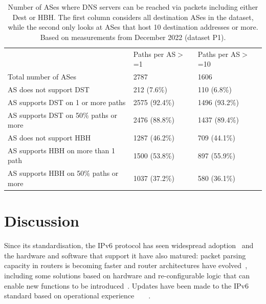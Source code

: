 \documentclass[conference]{IEEEtran}
\begin{document}
    \begin{table}
\begin{tabular}{p{}|p{}p{}}
                                          & Paths per AS$>$=1 & Paths per AS$>$=10 \\ \cline{1-3} 
Total number of ASes                      & 2787                                            & 1606                                            \\ \hline
AS does not support DST               & 212 (7.6\%)                                     & 110 (6.8\%)                                     \\
AS supports DST on 1 or more paths   & 2575 (92.4\%)                                   & 1496 (93.2\%)                                   \\
AS supports DST on 50\% paths or more & 2476  (88.8\%)                                  & 1437 (89.4\%)                                   \\ \hline
AS does not support HBH               & 1287 (46.2\%)                                   & 709 (44.1\%)                                    \\
AS supports HBH on more than 1 path   & 1500 (53.8\%)                                   & 897 (55.9\%)                                    \\
AS supports HBH on 50\% paths or more & 1037 (37.2\%)                                   & 580 (36.1\%)                                   
\end{tabular}
\label{tbl:as_pathspider}
\caption{Number of ASes where DNS servers can be reached via packets including either Dest or HBH. The first column considers all destination ASes in the dataset, while the second only looks at ASes that host 10 destination addresses or more. Based on measurements from December 2022 (dataset P1).}
\end{table}

\section{Discussion} 
\label{sec:discussion}

Since its standardisation, the IPv6 protocol has
seen widespread adoption~\cite{v6adoption_ton} and the hardware and software that
support it have also matured: packet parsing capacity in routers is becoming faster and
router architectures have evolved~\cite{metamorphosis, p4}, including some solutions based on hardware and re-configurable
logic that can enable new functions to be introduced~\cite{cisco-silicon-one}. Updates have been made to the IPv6 standard based on
operational experience~\cite{RFC5722}~\cite{RFC6946}~\cite{RFC6564}~\cite{RFC8200}.
\end{document}
